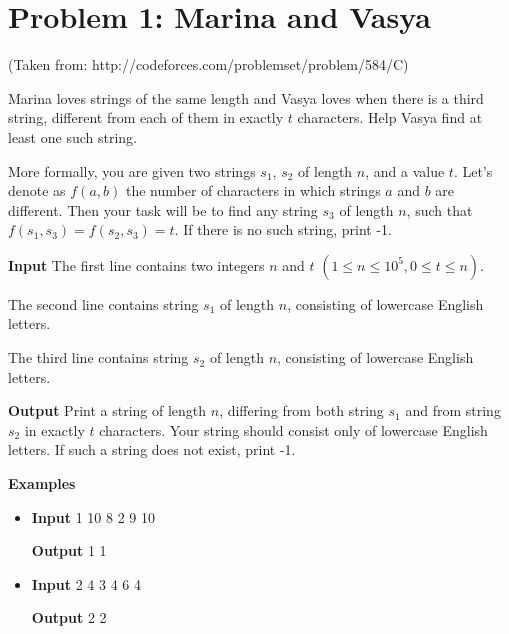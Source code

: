 \normalfont\documentclass[letterpaper,11pt]{article}
\begin{document}
\section*{Problem 1: Marina and Vasya}
(Taken from: http://codeforces.com/problemset/problem/584/C)

Marina loves strings of the same length and Vasya loves when there is a third string, different from each of them in exactly $t$ characters. Help Vasya find at least one such string.

More formally, you are given two strings $s_1$, $s_2$ of length $n$, and a value $t$. Let's denote as $f(a,b)$ the number of characters in which strings $a$ and $b$ are different. Then your task will be to find any string $s_3$ of length $n$, such that $f(s_1, s_3) = f(s_2, s_3) = t$. If there is no such string, print -1.

\textbf{Input} \newline
The first line contains two integers $n$ and $t$ $(1 \leq n \leq 10^5, 0 \leq t \leq n)$.

The second line contains string $s_1$ of length $n$, consisting of lowercase English letters.

The third line contains string $s_2$ of length $n$, consisting of lowercase English letters.

\textbf{Output} \newline
Print a string of length $n$, differing from both string $s_1$ and from string $s_2$ in exactly $t$ characters. Your string should consist only of lowercase English letters. If such a string does not exist, print -1.

\textbf{Examples}
\begin{itemize}
\item \textbf{Input}   1 10  8 2  9 10

\textbf{Output}  1 1

\item \textbf{Input}   2 4  3 4  6 4

\textbf{Output}  2 2
\end{itemize}
\end{document}
